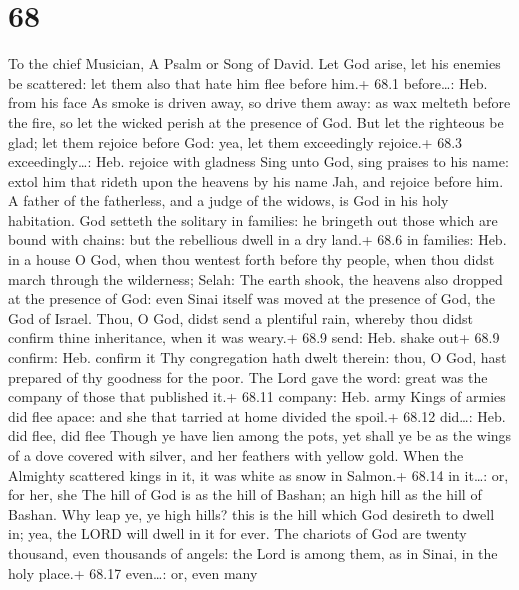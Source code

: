\hypertarget{section-67}{%
\section{68}\label{section-67}}

To the chief Musician, A Psalm or Song of David.  Let God
arise, let his enemies be scattered: let them also that hate him flee
before him.+ 68.1 before\ldots: Heb. from his face  As smoke
is driven away, so drive them away: as wax melteth before the fire, so
let the wicked perish at the presence of God.  But let the
righteous be glad; let them rejoice before God: yea, let them
exceedingly rejoice.+ 68.3 exceedingly\ldots: Heb. rejoice with gladness
 Sing unto God, sing praises to his name: extol him that
rideth upon the heavens by his name Jah, and rejoice before him.
 A father of the fatherless, and a judge of the widows, is
God in his holy habitation.  God setteth the solitary in
families: he bringeth out those which are bound with chains: but the
rebellious dwell in a dry land.+ 68.6 in families: Heb. in a house
 O God, when thou wentest forth before thy people, when thou
didst march through the wilderness; Selah:  The earth shook,
the heavens also dropped at the presence of God: even Sinai itself was
moved at the presence of God, the God of Israel.  Thou, O
God, didst send a plentiful rain, whereby thou didst confirm thine
inheritance, when it was weary.+ 68.9 send: Heb. shake out+ 68.9
confirm: Heb. confirm it  Thy congregation hath dwelt
therein: thou, O God, hast prepared of thy goodness for the poor.
 The Lord gave the word: great was the company of those
that published it.+ 68.11 company: Heb. army  Kings of
armies did flee apace: and she that tarried at home divided the spoil.+
68.12 did\ldots: Heb. did flee, did flee  Though ye have
lien among the pots, yet shall ye be as the wings of a dove covered with
silver, and her feathers with yellow gold.  When the
Almighty scattered kings in it, it was white as snow in Salmon.+ 68.14
in it\ldots: or, for her, she  The hill of God is as the
hill of Bashan; an high hill as the hill of Bashan.  Why
leap ye, ye high hills? this is the hill which God desireth to dwell in;
yea, the LORD will dwell in it for ever.  The chariots of
God are twenty thousand, even thousands of angels: the Lord is among
them, as in Sinai, in the holy place.+ 68.17 even\ldots: or, even many
